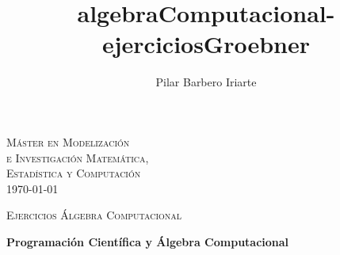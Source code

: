 \documentclass{article}
\author{Pilar Barbero Iriarte}
\title{algebraComputacional-ejerciciosGroebner}
\begin{document}
    
    
    
    \begin{titlepage}
\begin{center}



\textsc{\LARGE M\'aster en Modelizaci\'on \\e Investigaci\'on Matem\'atica,\\ Estad\'istica y Computaci\'on }\\[1.5cm]
{\large \today}

\textsc{Ejercicios \'Algebra Computacional}\\[0.5cm]

\vfill

{ \huge \bfseries Programaci\'on Cient\'ifica y \'Algebra Computacional \\[0.4cm] }

\vfill




\end{center}
\end{titlepage}
\end{document}
